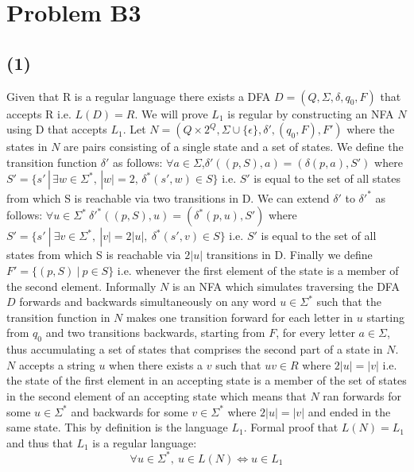 \documentclass[12pt]{article}
\begin{document}
\section*{Problem B3}
\subsection*{(1)}
  Given that R is a regular language there exists a DFA
  $D = (Q, \Sigma, \delta, q_0, F)$ that accepts R i.e. $L(D) = R$.
  We will prove $L_1$ is regular by constructing
  an NFA $N$ using D that accepts $L_1$. Let $N = (Q \times 2^Q,
  \Sigma \cup \{\epsilon\}, \delta{'}, (q_0 , F), F')$ where the states in $N$
  are pairs consisting of a single state and a set of states. We define the
  transition function $\delta{'}$ as follows:
  \newline
  \indent $\forall a \in \Sigma$,\:$\delta{'}((p,S), a) = (\delta(p,a), S')$
  where
  $S'= \{s'\,|\,\exists w \in \Sigma^*,\,|w| = 2,\, \delta^*(s',w) \in S\}$
  \newline
  \indent i.e. $S'$ is equal to the set of all states from which S is reachable
  via two transitions in D.
  \newline
  We can extend $\delta{'}$ to $\delta{'}^*$ as follows:
  \newline
  \indent $\forall u \in \Sigma^*\: \delta{'}^* ((p,S),u) = (\delta^* (p, u),S')$
  where $S' = \{s'\:|\:\exists v \in \Sigma^* ,\: |v|=2|u| ,\:
  \delta^* (s', v) \in S\}$
  \newline
  \indent i.e. $S'$ is equal to the set of all states from which S is reachable
  via $2|u|$ transitions in D.
  \newline
  Finally we define $F'=\{(p,S)\:|\: p \in S\}$ i.e. whenever the first element
  of the state is a member of the second element. Informally $N$ is an NFA which
  simulates traversing the DFA $D$ forwards and backwards simultaneously on any
  word $u \in \Sigma^*$ such that the transition function in $N$ makes one
  transition forward for each letter in $u$ starting from $q_0$ and two
  transitions backwards, starting from $F$, for every letter $a\in\Sigma$, thus
  accumulating a set of states that comprises the second part of a state in $N$.
  $N$ accepts a string $u$ when there exists a $v$ such that $uv \in R$ where
  $2|u| = |v|$ i.e. the state of the first element in an accepting state
  is a member of the set of states in the second element of an accepting state
  which means that $N$ ran forwards for some $u \in \Sigma^*$ and backwards for
  some $v \in \Sigma^*$ where $2|u| = |v|$ and ended in the same state.
  This by definition is the language $L_1$. Formal proof that $L(N) = L_1$ and
  thus that $L_1$ is a regular language:
  $$\forall u \in \Sigma^* ,\: u \in L(N) \iff u \in L_1$$
\end{document}
